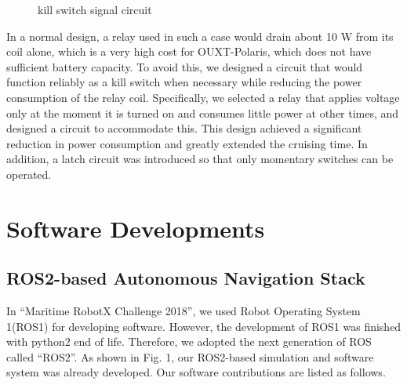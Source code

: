 \documentclass[lettersize,journal]{IEEEtran}
\begin{document}
\begin{figure}[H]
    \begin{center}
    \end{center}
    \caption{kill switch signal circuit}
    \label{fig:kill_switch_signal_circuit}
\end{figure}

In a normal design, a relay used in such a case would drain about 10 W from its coil alone, which is a very high cost for OUXT-Polaris, which does not have sufficient battery capacity.
To avoid this, we designed a circuit that would function reliably as a kill switch when necessary while reducing the power consumption of the relay coil.
Specifically, we selected a relay that applies voltage only at the moment it is turned on and consumes little power at other times, and designed a circuit to accommodate this.
This design achieved a significant reduction in power consumption and greatly extended the cruising time.
In addition, a latch circuit was introduced so that only momentary switches can be operated.

\section{Software Developments}
\subsection{ROS2-based Autonomous Navigation Stack}
In “Maritime RobotX Challenge 2018”, we used Robot Operating System 1(ROS1) for developing software.
However, the development of ROS1 was finished with python2 end of life.
Therefore, we adopted the next generation of ROS called “ROS2”. \cite{ROS2_paper}
As shown in Fig. 1, our ROS2-based simulation and software system was already developed.
Our software contributions are listed as follows.
\end{document}
